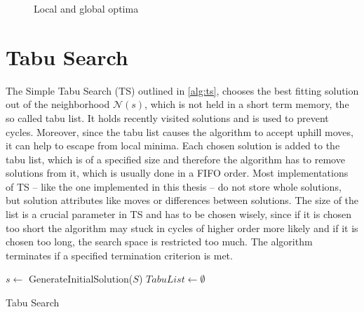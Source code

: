 \begin{center}
\begin{figure}
\caption{Local and global optima}
\end{figure}
\end{center}
\section{Tabu Search}
\label{sec:ts}
The Simple Tabu Search (TS) outlined in \ref{alg:ts}, chooses the best fitting solution out of the neighborhood $\mathcal{N}(s)$, which is not held in a short term memory, the so called tabu list. It holds recently visited solutions and is used to prevent cycles. Moreover, since the tabu list causes the algorithm to accept uphill moves, it can help to escape from local minima. Each chosen solution is added to the tabu list, which is of a specified size and therefore the algorithm has to remove solutions from it, which is usually done in a FIFO order. Most implementations of TS -- like the one implemented in this thesis -- do not store whole solutions, but solution attributes like moves or differences between solutions. The size of the list is a crucial parameter in TS and has to be chosen wisely, since if it is chosen too short the algorithm may stuck in cycles of higher order more likely and if it is chosen too long, the search space is restricted too much. The algorithm terminates if a specified termination criterion is met.\\
\begin{algorithm}[h]
$s \gets$ GenerateInitialSolution($S$)\;
$TabuList \gets \emptyset$
\caption{Tabu Search}
\label{alg:ts}
\end{algorithm}


